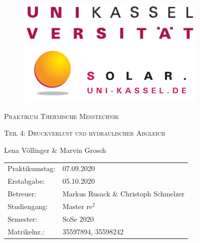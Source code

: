 \documentclass[10pt,a4paper,toc=listof,toc=bibliography]{scrartcl}
\begin{document}
\begin{titlepage}
	
	\begin{figure}[H]
		\begin{minipage}{0.5\textwidth}
			\centering
			\includegraphics[width=0.8\textwidth]{../DATA/Logo_Uni-Kassel.pdf}
		\end{minipage}\hfill
		\begin{minipage}{0.5\textwidth}
			\centering
			\includegraphics[width=0.8\textwidth]{../DATA/Logo_solar.png}
		\end{minipage}
	\end{figure}
	
		\vspace{3cm}
	
	\centering
	{\scshape\LARGE Praktikum Thermische Messtechnik \par}   %
	\vspace{1cm}
	{\scshape\Large Teil 4: Druckverlust und hydraulischer Abgleich \par}
	\vspace{1.5cm}
	\vspace{2cm}
	{\Large Lena Völlinger \& Marvin Grosch\par}
	\vfill
	
	\begin{large}
		\begin{tabular}{l l}
			
			Praktikumstag: & 07.09.2020 \\
			Erstabgabe: & 05.10.2020\\
			Betreuer: & Markus Rusack \& Christoph Schmelzer\\
			Studiengang: & Master $\text{re}^2$\\
			Semester: & SoSe 2020\\
			Matrikelnr.: & 35597894, 35598242\\ 
		\end{tabular}
	\end{large}

\end{titlepage}
\end{document}

